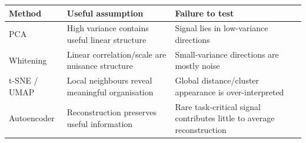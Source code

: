 \begin{tabularx}{\linewidth}{@{}L{.21\linewidth}YY@{}}
    \toprule
    Method & Useful assumption & Failure to test \\
    \midrule
    PCA & High variance contains useful linear structure & Signal lies in low-variance directions \\
    Whitening & Linear correlation/scale are nuisance structure & Small-variance directions are mostly noise \\
    t-SNE / UMAP & Local neighbours reveal meaningful organisation & Global distance/cluster appearance is over-interpreted \\
    Autoencoder & Reconstruction preserves useful information & Rare task-critical signal contributes little to average reconstruction \\
    \bottomrule
\end{tabularx}

